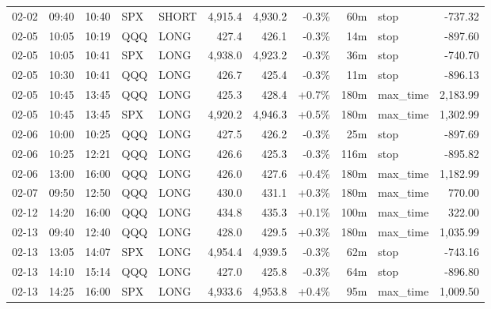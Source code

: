 \documentclass[11pt,a4paper,twoside]{article}
\begin{document}
\begin{center}
\begin{longtable}{>{\color{txtmain}}l l l l l r r r r >{\color{txtmain}}l r}
02-02 & 09:40 & 10:40 & SPX & SHORT & 4,915.4 & 4,930.2 & \textcolor{lossred}{-0.3\%} & 60m & stop & \textcolor{lossred}{-737.32} \\
02-05 & 10:05 & 10:19 & QQQ & LONG & 427.4 & 426.1 & \textcolor{lossred}{-0.3\%} & 14m & stop & \textcolor{lossred}{-897.60} \\
02-05 & 10:05 & 10:41 & SPX & LONG & 4,938.0 & 4,923.2 & \textcolor{lossred}{-0.3\%} & 36m & stop & \textcolor{lossred}{-740.70} \\
02-05 & 10:30 & 10:41 & QQQ & LONG & 426.7 & 425.4 & \textcolor{lossred}{-0.3\%} & 11m & stop & \textcolor{lossred}{-896.13} \\
02-05 & 10:45 & 13:45 & QQQ & LONG & 425.3 & 428.4 & \textcolor{wingreen}{+0.7\%} & 180m & max\_time & \textcolor{wingreen}{2,183.99} \\
02-05 & 10:45 & 13:45 & SPX & LONG & 4,920.2 & 4,946.3 & \textcolor{wingreen}{+0.5\%} & 180m & max\_time & \textcolor{wingreen}{1,302.99} \\
02-06 & 10:00 & 10:25 & QQQ & LONG & 427.5 & 426.2 & \textcolor{lossred}{-0.3\%} & 25m & stop & \textcolor{lossred}{-897.69} \\
02-06 & 10:25 & 12:21 & QQQ & LONG & 426.6 & 425.3 & \textcolor{lossred}{-0.3\%} & 116m & stop & \textcolor{lossred}{-895.82} \\
02-06 & 13:00 & 16:00 & QQQ & LONG & 426.0 & 427.6 & \textcolor{wingreen}{+0.4\%} & 180m & max\_time & \textcolor{wingreen}{1,182.99} \\
02-07 & 09:50 & 12:50 & QQQ & LONG & 430.0 & 431.1 & \textcolor{wingreen}{+0.3\%} & 180m & max\_time & \textcolor{wingreen}{770.00} \\
02-12 & 14:20 & 16:00 & QQQ & LONG & 434.8 & 435.3 & \textcolor{wingreen}{+0.1\%} & 100m & max\_time & \textcolor{wingreen}{322.00} \\
02-13 & 09:40 & 12:40 & QQQ & LONG & 428.0 & 429.5 & \textcolor{wingreen}{+0.3\%} & 180m & max\_time & \textcolor{wingreen}{1,035.99} \\
02-13 & 13:05 & 14:07 & SPX & LONG & 4,954.4 & 4,939.5 & \textcolor{lossred}{-0.3\%} & 62m & stop & \textcolor{lossred}{-743.16} \\
02-13 & 14:10 & 15:14 & QQQ & LONG & 427.0 & 425.8 & \textcolor{lossred}{-0.3\%} & 64m & stop & \textcolor{lossred}{-896.80} \\
02-13 & 14:25 & 16:00 & SPX & LONG & 4,933.6 & 4,953.8 & \textcolor{wingreen}{+0.4\%} & 95m & max\_time & \textcolor{wingreen}{1,009.50} \\

\end{longtable}
\end{center}
\end{document}
